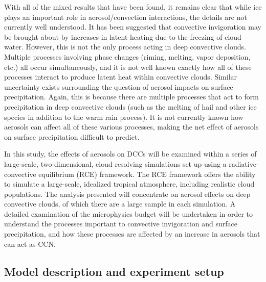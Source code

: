 With all of the mixed results that have been found, it remains clear that while ice plays an important role in aerosol/convection interactions, the details are not currently well understood.  It has been suggested that convective invigoration may be brought about by increases in latent heating due to the freezing of cloud water.  However, this is not the only process acting in deep convective clouds.  Multiple processes involving phase changes (riming, melting, vapor deposition, etc.) all occur simultaneously, and it is not well known exactly how all of these processes interact to produce latent heat within convective clouds.  Similar uncertainty exists surrounding the question of aerosol impacts on surface precipitation.  Again, this is because there are multiple processes that act to form precipitation in deep convective clouds (such as the melting of hail and other ice species in addition to the warm rain process).  It is not currently known how aerosols can affect all of these various processes, making the net effect of aerosols on surface precipitation difficult to predict.  

In this study, the effects of aerosols on DCCs will be examined within a series of large-scale, two-dimensional, cloud resolving simulations set up using a radiative-convective equilibrium (RCE) framework.  The RCE framework offers the ability to simulate a large-scale, idealized tropical atmosphere, including realistic cloud populations.  The analysis presented will concentrate on aerosol effects on deep convective clouds, of which there are a large sample in each simulation.  A detailed examination of the microphysics budget will be undertaken in order to understand the processes important to convective invigoration and surface precipitation, and how these processes are affected by an increase in aerosols that can act as CCN. 


\subsection{Model description and experiment setup}

